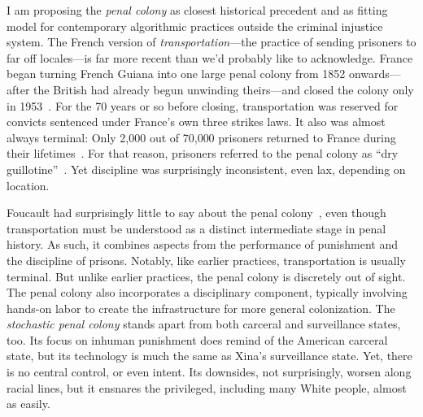I am proposing the \emph{penal colony} as closest historical precedent and as
fitting model for contemporary algorithmic practices outside the criminal
injustice system. The French version of \emph{transportation}---the practice
of sending prisoners to far off locales---is far more recent than we'd
probably like to acknowledge. France began turning French Guiana into one large
penal colony from 1852 onwards---after the British had already begun unwinding
theirs---and closed the colony only in
1953~\cite{Aldrich2010,Anderson2018,Spierenburg2009}. For the 70 years or so
before closing, transportation was reserved for convicts sentenced under
France's own three strikes laws. It also was almost always terminal: Only 2,000
out of 70,000 prisoners returned to France during their
lifetimes~\cite{WallechinskyWallace1978}. For that reason, prisoners referred to
the penal colony as ``dry guillotine''~\cite{Furlong1913,ReneBelbenoit1938}. Yet
discipline was surprisingly inconsistent, even lax, depending on location.

Foucault had surprisingly little to say about the penal
colony~\cite{Redfield2005}, even though transportation must be understood as a
distinct intermediate stage in penal history. As such, it combines aspects from
the performance of punishment and the discipline of prisons. Notably, like
earlier practices, transportation is usually terminal. But unlike earlier
practices, the penal colony is discretely out of sight. The penal colony also
incorporates a disciplinary component, typically involving hands-on labor to
create the infrastructure for more general colonization. The \emph{stochastic
penal colony} stands apart from both carceral and surveillance states, too. Its
focus on inhuman punishment does remind of the American carceral state, but its
technology is much the same as Xina's surveillance state. Yet, there is no
central control, or even intent. Its downsides, not surprisingly, worsen along
racial lines, but it ensnares the privileged, including many White people,
almost as easily.

